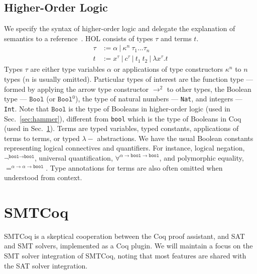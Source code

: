 \documentclass{article}
\begin{document}
	\subsection{Higher-Order Logic}
	\label{sec:hol}
	We specify the 
	syntax of higher-order logic 
	and delegate the explanation of 
	semantics to a 
	reference~\cite{10.5555/155278}. 
	HOL consists of 
	types $\tau$ and terms $t$. 
	\begin{align*}
	\tau &:= \alpha\ |\ \kappa^n\ 
	\tau_1 ... \tau_n\\
	t &:= x^{\tau}\ |\ c^{\tau}\ |\ t_1\ t_2\ 
	|\ \lambda x^{\tau}.t
	\end{align*}	
	Types $\tau$ are either type
	variables $\alpha$ or 
	applications of type 
	constructors $\kappa^n$ to 
	$n$ types ($n$ is usually omitted). 
	Particular types of interest are 
	the function type --- formed by 
	applying the arrow type constructor 
	$\to^{2}$ to other types, the 
	Boolean type --- $\texttt{Bool}$ 
	(or $\texttt{Bool}^0$), the type of 
	natural numbers --- \texttt{Nat},
	and integers --- \texttt{Int}.
	Note that $\texttt{Bool}$ is the 
	type of Booleans in higher-order
	logic (used in 
	Sec.~\ref{sec:hammer}), different
	from \texttt{bool} which is the 
	type of Booleans in Coq (used 
	in Sec.~\ref{sec:smtcoq}).
	Terms are typed variables, 
	typed constants, applications 
	of terms to terms, or typed
	$\lambda-$ abstractions. We have
	the usual Boolean constants 
	representing logical connectives
	and quantifiers. For instance, 
	logical negation, 
	$\neg^{\texttt{bool} \to 
		\texttt{bool}}$, universal 
	quantification,
	$\forall^{\alpha \to 
		\texttt{bool} \to \texttt{bool}}$, 
	and polymorphic equality,
	$=^{\alpha \to \alpha 
		\to \texttt{bool}}$. Type 
	annotations for terms are also 
	often omitted when understood
	from context.
	
	
	\section{SMTCoq}
	\label{sec:smtcoq}
	SMTCoq is a skeptical cooperation 
	between the Coq proof assistant, and 
	SAT and SMT solvers, implemented as a 
	Coq plugin. We will maintain a focus 
	on the SMT solver integration of 
	SMTCoq, noting that most features are 
	shared with the SAT	solver integration.
	
\end{document}
